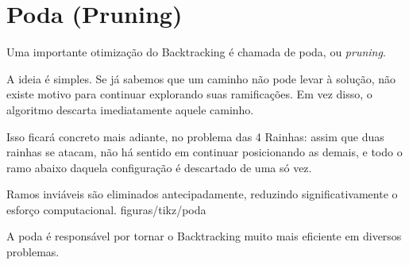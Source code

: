 \section{Poda (Pruning)}

Uma importante otimização do Backtracking é chamada de poda, ou \emph{pruning}.

A ideia é simples. Se já sabemos que um caminho não pode levar à solução, não existe motivo para continuar explorando suas ramificações. Em vez disso, o algoritmo descarta imediatamente aquele caminho.

Isso ficará concreto mais adiante, no problema das 4 Rainhas: assim que duas rainhas se atacam, não há sentido em continuar posicionando as demais, e todo o ramo abaixo daquela configuração é descartado de uma só vez.

%
  {Ramos inviáveis são eliminados antecipadamente, reduzindo significativamente o esforço computacional.}%
  {figuras/tikz/poda}

A poda é responsável por tornar o Backtracking muito mais eficiente em diversos problemas.
